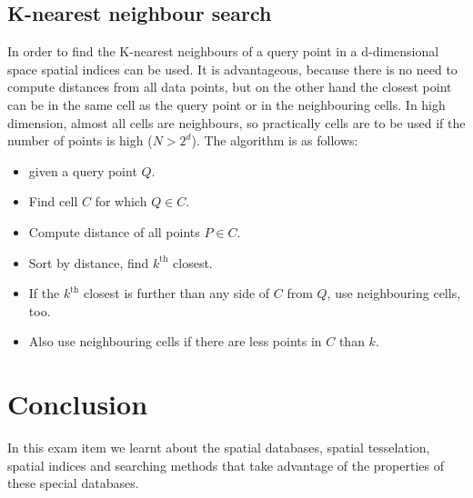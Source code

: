 \documentclass[12pt]{article}
\theoremstyle{plain}
\begin{document}
\subsection{K-nearest neighbour search}

In order to find the K-nearest neighbours of a query point in a d-dimensional space spatial indices can be used. It is advantageous, because there is no need to compute distances from all data points, but on the other hand the closest point can be in the same cell as the query point or in the neighbouring cells. In high dimension, almost all cells are neighbours, so practically cells are to be used if the number of points is high ($N > 2^d$). The algorithm is as follows:

\begin{itemize}
	\item given a query point $Q$.
	\item Find cell $C$ for which $Q \in C$.
	\item Compute distance of all points $P \in C$. 
	\item Sort by distance, find $k^{\text{th}}$ closest.
	\item If the $k^{\text{th}}$ closest is further than any side of $C$ from $Q$, use neighbouring cells, too. 
	\item Also use neighbouring cells if there are less points in $C$ than $k$.
\end{itemize}


\section{Conclusion}

In this exam item we learnt about the spatial databases, spatial tesselation, spatial indices and searching methods that take advantage of the properties of these special databases.

\vfill
\end{document}

